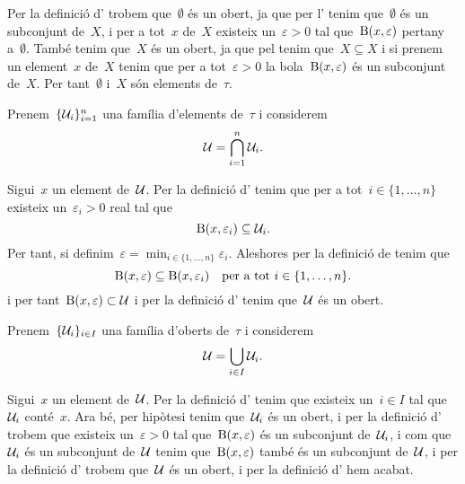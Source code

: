 \documentclass[../topologia.tex]{subfiles}
\begin{document}
    \begin{solution}
        Per la definició d' trobem que~\(\emptyset\) és un obert, ja que per l' tenim que~\(\emptyset\) és un subconjunt de~\(X\), i per a tot~\(x\) de~\(X\) existeix un~\(\varepsilon>0\) tal que~\(\operatorname{B}(x,\varepsilon)\) pertany a~\(\emptyset\).
        També tenim que~\(X\) és un obert, ja que pel  tenim que~\(X\subseteq X\) i si prenem un element~\(x\) de~\(X\) tenim que per a tot~\(\varepsilon>0\) la bola~\(\operatorname{B}(x,\varepsilon)\) és un subconjunt de~\(X\).
        Per tant~\(\emptyset\) i~\(X\) són elements de~\(\tau\).

        Prenem~\(\{\mathcal{U}_{i}\}_{i=1}^{n}\) una família d'elements de~\(\tau\) i considerem
        \[
            \mathcal{U}=\bigcap_{i=1}^{n}\mathcal{U}_{i}.
        \]

        Sigui~\(x\) un element de~\(\mathcal{U}\).
        Per la definició d' tenim que per a tot~\(i\in\{1,\dots,n\}\) existeix un~\(\varepsilon_{i}>0\) real tal que
        \[
            \operatorname{B}(x,\varepsilon_{i})\subseteq\mathcal{U}_{i}.
        \]
        Per tant, si definim~\(\varepsilon=\min_{i\in\{1,\dots,n\}}\varepsilon_{i}\).
        Aleshores per la definició de  tenim que
        \[
            \operatorname{B}(x,\varepsilon)\subseteq\operatorname{B}(x,\varepsilon_{i})\quad\text{per a tot }i\in\{1,\dots,n\}.
        \]
        i per tant~\(\operatorname{B}(x,\varepsilon)\subset\mathcal{U}\) i per la definició d' tenim que~\(\mathcal{U}\) és un obert.

        Prenem~\(\{\mathcal{U}_{i}\}_{i\in I}\) una família d'oberts de~\(\tau\) i considerem
        \[
            \mathcal{U}=\bigcup_{i\in I}\mathcal{U}_{i}.
        \]

        Sigui~\(x\) un element de~\(\mathcal{U}\).
        Per la definició d' tenim que existeix un~\(i\in I\) tal que~\(\mathcal{U}_{i}\) conté~\(x\).
        Ara bé, per hipòtesi tenim que~\(\mathcal{U}_{i}\) és un obert, i per la definició d' trobem que existeix un~\(\varepsilon>0\) tal que~\(\operatorname{B}(x,\varepsilon)\) és un subconjunt de~\(\mathcal{U}_{i}\), i com que~\(\mathcal{U}_{i}\) és un subconjunt de~\(\mathcal{U}\) tenim que~\(\operatorname{B}(x,\varepsilon)\) també és un subconjunt de~\(\mathcal{U}\), i per la definició d' trobem que~\(\mathcal{U}\) és un obert, i per la definició d' hem acabat.
    \end{solution}
\end{document}
